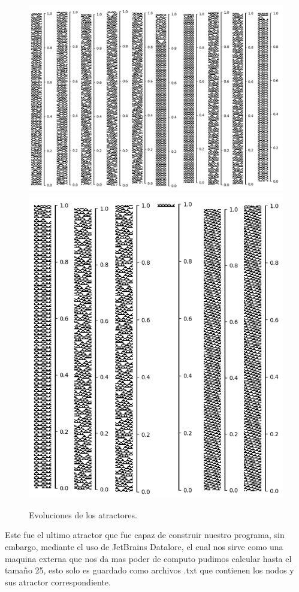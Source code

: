 \documentclass[11pt]{article}
\begin{document}
			\begin{figure}[H]
			\centering
			\includegraphics[scale=0.3]{resources/Atractores54/atractor_54_size_18_res.png}
			\includegraphics[scale=0.3]{resources/Atractores54/atractor_54_size_18_res1.png}
			\caption{Evoluciones de los atractores.}\label{fig:picture}
			\end{figure}
			Este fue el ultimo atractor que fue capaz de construir nuestro programa, sin embargo, mediante el uso de JetBrains Datalore, el cual nos sirve como una maquina externa que nos da mas poder de computo pudimos calcular hasta el tamaño 25, esto solo es guardado como archivos .txt que contienen los nodos y sus atractor correspondiente.
\end{document}
